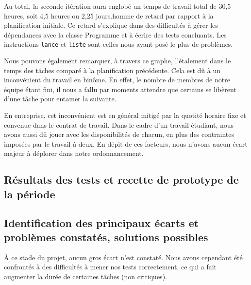 \documentclass[12pt,a4paper,titlepage,openany, oneside]{report}
\begin{document}
    Au total, la seconde itération aura englobé un temps de travail total de 30,5 heures,
    soit 4,5 heures ou 2,25 jours.homme de retard par rapport à la planification initiale. Ce
    retard s'explique dans des difficultés à gérer les dépendances avec la classe Programme
    et à écrire des tests concluants. Les instructions \verb|lance| et \verb|liste| sont
    celles nous ayant posé le plus de problèmes.

    Nous pouvons également remarquer, à travers ce graphe, l'étalement dans le temps
    des tâches comparé à la planification précédente. Cela est dû à un inconvénient du
    travail en binôme. En effet, le nombre de membres de notre équipe étant fini, il nous
    a fallu par moments attendre que certains se libèrent d'une tâche pour entamer la
    suivante.

    En entreprise, cet inconvénient est en général mitigé par la quotité horaire
    fixe et convenue dans le contrat de travail. Dans le cadre d'un travail étudiant, nous
    avons aussi dû jouer avec les disponibilités de chacun, en plus des contraintes
    imposées par le travail à deux. En dépit de ces facteurs, nous n'avons aucun écart
    majeur à déplorer dans notre ordonnancement.


    \subsection{Résultats des tests et recette de prototype de la période}


    \subsection{Identification des principaux écarts et problèmes constatés, solutions possibles}
        \`{A} ce stade du projet, aucun gros écart n'est constaté. Nous avons cependant
        été confrontés à des difficultés à mener nos tests correctement, ce qui a fait
        augmenter la durée de certaines tâches (non critiques).
\end{document}
